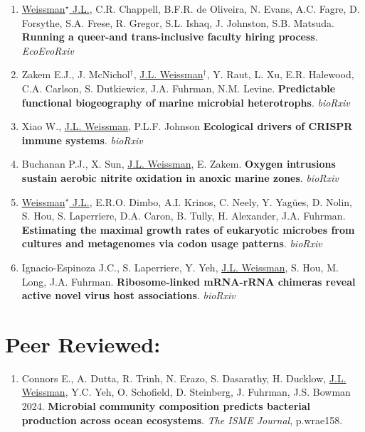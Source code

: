 \documentclass[]{res}
\begin{document}
\begin{resume}
 \begin{enumerate}[leftmargin=*]
 \setlength\itemsep{0.25em}

\item \underline{Weissman$^\star$ J.L.}, C.R. Chappell, B.F.R. de Oliveira, N. Evans, A.C. Fagre, D. Forsythe, S.A. Frese, R. Gregor, S.L. Ishaq, J. Johnston, S.B. Matsuda. {\bf Running a queer-and trans-inclusive faculty hiring process}. \emph{EcoEvoRxiv}

\item Zakem E.J., J. McNichol$^\dagger$, \underline{J.L. Weissman}$^\dagger$, Y. Raut, L. Xu, E.R. Halewood, C.A. Carlson, S. Dutkiewicz, J.A. Fuhrman, N.M. Levine. {\bf Predictable functional biogeography of marine microbial heterotrophs}. \emph{bioRxiv}

\item Xiao W., \underline{J.L. Weissman}, P.L.F. Johnson {\bf Ecological drivers of CRISPR immune systems}. \emph{bioRxiv}

\item Buchanan P.J., X. Sun, \underline{J.L. Weissman}, E. Zakem. {\bf Oxygen intrusions sustain aerobic nitrite 
oxidation in anoxic marine zones}. \emph{bioRxiv}

\item \underline{Weissman$^\star$ J.L.}, E.R.O. Dimbo, A.I. Krinos, C. Neely, Y. Yag\"{ues}, D. Nolin, S. Hou, S. Laperriere, D.A. Caron, B. Tully, H. Alexander, J.A. Fuhrman. {\bf Estimating the maximal growth rates of eukaryotic microbes from cultures and metagenomes via codon usage patterns}. \emph{bioRxiv}

\item Ignacio-Espinoza J.C., S. Laperriere, Y. Yeh, \underline{J.L. Weissman}, S. Hou, M. Long, J.A. Fuhrman. {\bf Ribosome-linked mRNA-rRNA chimeras reveal active novel virus host associations}. \emph{bioRxiv}
 

  \end{enumerate} 

  
 \section{Peer Reviewed:} \vspace{0mm}
 
\begin{enumerate}[leftmargin=*]
 \setlength\itemsep{0.25em}
 
 \item Connors E., A. Dutta, R. Trinh, N. Erazo, S. Dasarathy, H. Ducklow, \underline{J.L. Weissman}, Y.C. Yeh, O. Schofield, D. Steinberg, J. Fuhrman, J.S. Bowman 2024. {\bf Microbial community composition predicts bacterial production across ocean ecosystems}. \emph{The ISME Journal}, p.wrae158.


\end{enumerate}
\end{resume}
\end{document}
